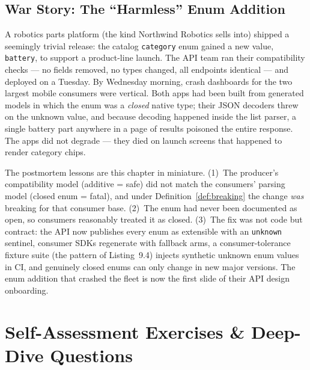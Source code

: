 \subsection*{War Story: The ``Harmless'' Enum Addition}
A robotics parts platform (the kind Northwind Robotics sells into) shipped a
seemingly trivial release: the catalog \texttt{category} enum gained a new
value, \texttt{battery}, to support a product-line launch. The API team ran
their compatibility checks --- no fields removed, no types changed, all
endpoints identical --- and deployed on a Tuesday. By Wednesday morning,
crash dashboards for the two largest mobile consumers were vertical. Both
apps had been built from generated models in which the enum was a
\emph{closed} native type; their JSON decoders threw on the unknown value,
and because decoding happened inside the list parser, a single battery part
anywhere in a page of results poisoned the entire response. The apps did not
degrade --- they died on launch screens that happened to render category
chips.

The postmortem lessons are this chapter in miniature. (1)~The producer's
compatibility model (additive = safe) did not match the consumers' parsing
model (closed enum = fatal), and under Definition~\ref{def:breaking} the
change \emph{was} breaking for that consumer base. (2)~The enum had never
been documented as open, so consumers reasonably treated it as closed.
(3)~The fix was not code but contract: the API now publishes every enum as
extensible with an \texttt{unknown} sentinel, consumer SDKs regenerate with
fallback arms, a consumer-tolerance fixture suite (the pattern of
Listing~9.4) injects synthetic unknown enum values in CI, and genuinely
closed enums can only change in new major versions. The enum addition that
crashed the fleet is now the first slide of their API design onboarding.

\section{Self-Assessment Exercises \& Deep-Dive Questions}
\label{sec:ch9-exercises}

